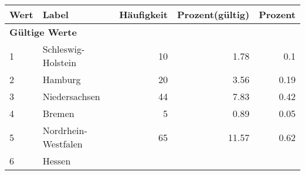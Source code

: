      \begin{longtable}{lXrrr}
     \toprule
     \textbf{Wert} & \textbf{Label} & \textbf{Häufigkeit} & \textbf{Prozent(gültig)} & \textbf{Prozent} \\
     \endhead
     \midrule
     \multicolumn{5}{l}{\textbf{Gültige Werte}}\\

     1 &
     \multicolumn{1}{X}{ Schleswig-Holstein   } &


       \num{10} &
       \num[round-mode=places,round-precision=2]{1.78} &
         \num[round-mode=places,round-precision=2]{0.1} \\

     2 &
     \multicolumn{1}{X}{ Hamburg   } &


       \num{20} &
       \num[round-mode=places,round-precision=2]{3.56} &
         \num[round-mode=places,round-precision=2]{0.19} \\

     3 &
     \multicolumn{1}{X}{ Niedersachsen   } &


       \num{44} &
       \num[round-mode=places,round-precision=2]{7.83} &
         \num[round-mode=places,round-precision=2]{0.42} \\

     4 &
     \multicolumn{1}{X}{ Bremen   } &


       \num{5} &
       \num[round-mode=places,round-precision=2]{0.89} &
         \num[round-mode=places,round-precision=2]{0.05} \\

     5 &
     \multicolumn{1}{X}{ Nordrhein-Westfalen   } &


       \num{65} &
       \num[round-mode=places,round-precision=2]{11.57} &
         \num[round-mode=places,round-precision=2]{0.62} \\

     6 &
     \multicolumn{1}{X}{ Hessen   } &



\end{longtable}

